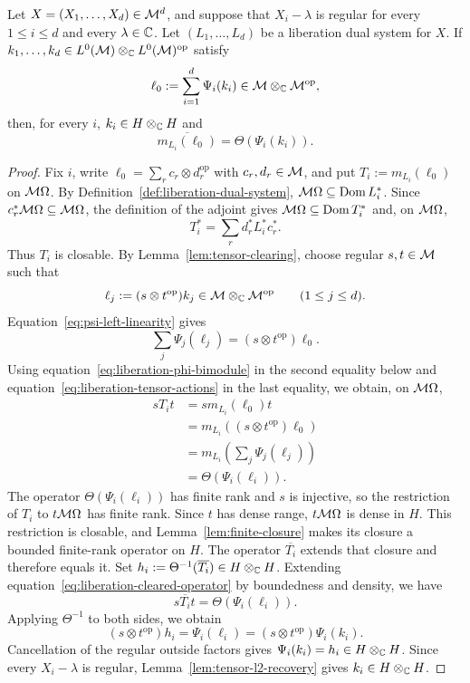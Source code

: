 \begin{lemma}\label{lem:tensor-images-l2}
Let $X=(X_1,\ldots,X_d)\in\mathcal M^d$, and suppose that $X_i-\lambda$ is regular for every $1\leq i\leq d$ and every $\lambda\in\mathbb C$.
Let $(L_1,\ldots,L_d)$ be a liberation dual system for $X$.
If $k_1,\ldots,k_d\in L^0(\mathcal M)\otimes_{\mathbb C}L^0(\mathcal M)^{\mathrm{op}}$ satisfy
\[
 \ell_0:=\sum_{i=1}^d\Psi_i(k_i)\in\mathcal M\otimes_{\mathbb C}\mathcal M^{\mathrm{op}},
\]
then, for every $i$, $k_i\in H\otimes_{\mathbb C}H$ and
\begin{equation}\label{eq:liberation-tensor-closure}
 \overline{m_{L_i}(\ell_0)}=\Theta(\Psi_i(k_i)).
\end{equation}
\end{lemma}
\begin{proof}
Fix $i$, write $\ell_0=\sum_r c_r\otimes d_r^{\mathrm{op}}$ with $c_r,d_r\in\mathcal M$, and put $T_i:=m_{L_i}(\ell_0)$ on $\mathcal M\Omega$.
By Definition~\ref{def:liberation-dual-system}, $\mathcal M\Omega\subseteq\operatorname{Dom} L_i^*$.
Since $c_r^*\mathcal M\Omega\subseteq\mathcal M\Omega$, the definition of the adjoint gives $\mathcal M\Omega\subseteq\operatorname{Dom} T_i^*$ and, on $\mathcal M\Omega$,
\[
 T_i^*=\sum_r d_r^*L_i^*c_r^*.
\]
Thus $T_i$ is closable.
By Lemma~\ref{lem:tensor-clearing}, choose regular $s,t\in\mathcal M$ such that
\[
 \ell_j:=(s\otimes t^{\mathrm{op}})k_j
 \in\mathcal M\otimes_{\mathbb C}\mathcal M^{\mathrm{op}}
 \qquad(1\leq j\leq d).
\]
Equation~\eqref{eq:psi-left-linearity} gives
\[
 \sum_j\Psi_j(\ell_j)=(s\otimes t^{\mathrm{op}})\ell_0.
\]
Using equation~\eqref{eq:liberation-phi-bimodule} in the second equality below and equation~\eqref{eq:liberation-tensor-actions} in the last equality, we obtain, on $\mathcal M\Omega$,
\begin{equation}\label{eq:liberation-cleared-operator}
 \begin{aligned}
 sT_it
 &=sm_{L_i}(\ell_0)t\\
 &=m_{L_i}((s\otimes t^{\mathrm{op}})\ell_0)\\
 &=m_{L_i}\!\left(\sum_j\Psi_j(\ell_j)\right)\\
 &=\Theta(\Psi_i(\ell_i)).
 \end{aligned}
\end{equation}
The operator $\Theta(\Psi_i(\ell_i))$ has finite rank and $s$ is injective, so the restriction of $T_i$ to $t\mathcal M\Omega$ has finite rank.
Since $t$ has dense range, $t\mathcal M\Omega$ is dense in $H$.
This restriction is closable, and Lemma~\ref{lem:finite-closure} makes its closure a bounded finite-rank operator on $H$.
The operator $\overline{T_i}$ extends that closure and therefore equals it.
Set $h_i:=\Theta^{-1}(\overline{T_i})\in H\otimes_{\mathbb C}H$.
Extending equation~\eqref{eq:liberation-cleared-operator} by boundedness and density, we have
\[
 s\overline{T_i}t=\Theta(\Psi_i(\ell_i)).
\]
Applying $\Theta^{-1}$ to both sides, we obtain
\[
 (s\otimes t^{\mathrm{op}})h_i
 =\Psi_i(\ell_i)
 =(s\otimes t^{\mathrm{op}})\Psi_i(k_i).
\]
Cancellation of the regular outside factors gives $\Psi_i(k_i)=h_i\in H\otimes_{\mathbb C}H$.
Since every $X_i-\lambda$ is regular, Lemma~\ref{lem:tensor-l2-recovery} gives $k_i\in H\otimes_{\mathbb C}H$.
\end{proof}


